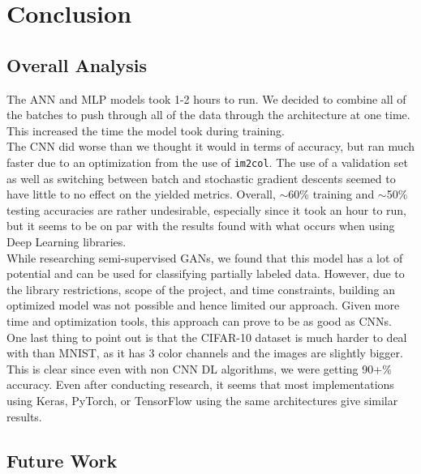 \section{Conclusion}
\label{sec:conclusion}

\subsection{Overall Analysis}
\label{sec:conclusion: Overall Analysis}

The ANN and MLP models took 1-2 hours to run. We decided to combine all of the batches to push through all of the data through the architecture at one time. This increased the time the model took during training.\\ 

\noindent The CNN did worse than we thought it would in terms of accuracy, but ran much faster due to an optimization from the use of \verb|im2col|. The use of a validation set as well as switching between batch and stochastic gradient descents seemed to have little to no effect on the yielded metrics. Overall, $\sim$60\% training and $\sim$50\% testing accuracies are rather undesirable, especially since it took an hour to run, but it seems to be on par with the results found with what occurs when using Deep Learning libraries. \cite{yang_2019}\\

\noindent While researching semi-supervised GANs, we found that this model has a lot of potential and can be used for classifying partially labeled data. However, due to the library restrictions, scope of the project, and time constraints, building an optimized model was not possible and hence limited our approach. Given more time and optimization tools, this approach can prove to be as good as CNNs.\\

\noindent One last thing to point out is that the CIFAR-10 dataset is much harder to deal with than MNIST, as it has 3 color channels and the images are slightly bigger. This is clear since even with non CNN DL algorithms, we were getting 90+\% accuracy. Even after conducting research, it seems that most implementations using Keras, PyTorch, or TensorFlow using the same architectures give similar results.\\

\subsection{Future Work}
\label{sec:conclusion: Future Work}

